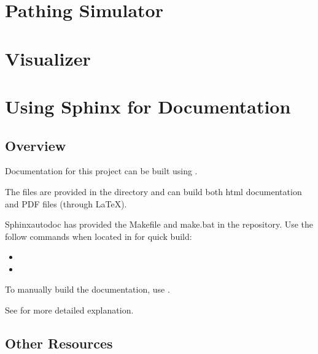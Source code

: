 \documentclass[letterpaper,10pt,english]{sphinxmanual}
\begin{document}
\section{Pathing Simulator}
\label{\detokenize{pathing_sim:pathing-simulator}}\label{\detokenize{pathing_sim::doc}}

\section{Visualizer}
\label{\detokenize{visualizer:visualizer}}\label{\detokenize{visualizer::doc}}

\section{Using Sphinx for Documentation}
\label{\detokenize{using_sphinx:using-sphinx-for-documentation}}\label{\detokenize{using_sphinx::doc}}

\subsection{Overview}
\label{\detokenize{using_sphinx:overview}}
\sphinxAtStartPar
Documentation for this project can be built using .

\sphinxAtStartPar
The files are provided in the  directory and can build
both html documentation and PDF files (through LaTeX).

\sphinxAtStartPar
Sphinx\sphinxhyphen{}autodoc has provided the Makefile and make.bat in the 
repository. Use the follow commands when located in  for quick build:
\begin{itemize}
\item {} 
\sphinxAtStartPar
{}

\item {} 
\sphinxAtStartPar
{}

\end{itemize}

\sphinxAtStartPar
To manually build the documentation, use .

\sphinxAtStartPar
See 
for more detailed explanation.


\subsection{Other Resources}
\label{\detokenize{using_sphinx:other-resources}}
\end{document}
